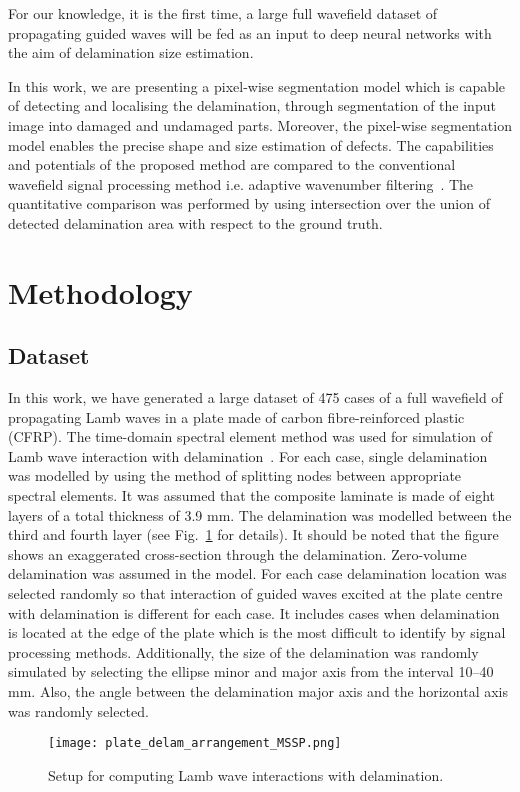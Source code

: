\documentclass[preprint,9pt]{elsarticle}
\begin{document}
For our knowledge, it is the first time, a large full wavefield dataset of propagating guided waves will be fed as an input to deep neural networks with the aim of delamination size estimation.

In this work, we are presenting a pixel-wise segmentation model which is capable of detecting and localising the delamination, through segmentation of the input image into damaged and undamaged parts.
Moreover, the pixel-wise segmentation model enables the precise shape and size estimation of defects.
The capabilities and potentials of the proposed method are compared to the conventional wavefield signal processing method i.e. adaptive wavenumber filtering~\cite{Kudela2015,Radzienski2019}.
The quantitative comparison was performed by using intersection over the union of detected delamination area with respect to the ground truth. 

	\section{Methodology}
	\subsection{Dataset}
	In this work, we have generated a large dataset of 475 cases of a full wavefield of propagating Lamb waves in a plate made of carbon fibre-reinforced plastic (CFRP).
	The time-domain spectral element method was used for simulation of Lamb wave interaction with delamination~\cite{Kudela2020}.
	For each case, single delamination was modelled by using the method of splitting nodes between appropriate spectral elements. 
	It was assumed that the composite laminate is made of eight layers of a total thickness of 3.9 mm.
	The delamination was modelled between the third and fourth layer (see Fig.~\ref{fig:plate_setup} for details).
	It should be noted that the figure shows an exaggerated cross-section through the delamination. 
	Zero-volume delamination was assumed in the model. 
	For each case delamination location was selected randomly so that interaction of guided waves excited at the plate centre with delamination is different for each case.
	It includes cases when delamination is located at the edge of the plate which is the most difficult to identify by signal processing methods.
	Additionally, the size of the delamination was randomly simulated by selecting the ellipse minor and major axis from the interval 10--40 mm.
	Also, the angle between the delamination major axis and the horizontal axis was randomly selected.
	\begin{figure}
		\centering
		\texttt{[image: plate\_delam\_arrangement\_MSSP.png]}
		\caption{Setup for computing Lamb wave interactions with delamination.}
		\label{fig:plate_setup}
	\end{figure}
\end{document}
